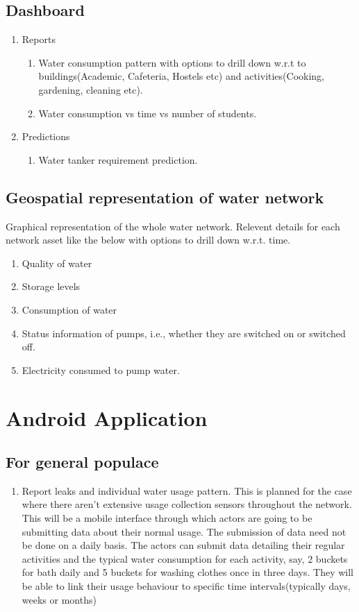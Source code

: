\documentclass[paper=a4, fontsize=11pt]{scrartcl} %
\numberwithin{equation}{section} %
\numberwithin{figure}{section} %
\numberwithin{table}{section} %
\begin{document}
\subsection{ Dashboard }
\begin{enumerate}
\item
Reports
\begin{enumerate}
\item
Water consumption pattern with options to drill down w.r.t to buildings(Academic, Cafeteria, Hostels etc) and activities(Cooking, gardening, cleaning etc).
\item
Water consumption vs time vs number of students.
\end{enumerate}
\item
Predictions
\begin{enumerate}
\item
Water tanker requirement prediction.
\end{enumerate}
\end{enumerate}

\subsection{Geospatial representation of water network}
Graphical representation of the whole water network. Relevent details for each network asset like the below with options to drill down w.r.t. time.
\begin{enumerate}
\item
Quality of water
\item
Storage levels
\item
Consumption of water
\item
Status information of pumps, i.e., whether they are switched on or switched off.
\item
Electricity consumed to pump water.
\end{enumerate}



\section{Android Application}
\subsection{For general populace}
\begin{enumerate}
\item
Report leaks and individual water usage pattern.
\newline
This is planned for the case where there aren't extensive usage collection sensors throughout the network. This will be a mobile interface through which actors are going to be submitting data about their normal usage. The submission of data need not be done on a daily basis. The actors can submit data detailing their regular activities and the typical water consumption for each activity, say, 2 buckets for bath daily and 5 buckets for washing clothes once in three days. They will be able to link their usage behaviour to specific time intervals(typically days, weeks or months)
\end{enumerate}
\end{document}
